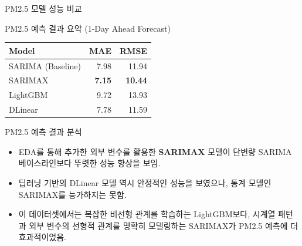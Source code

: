 \documentclass[serif, aspectratio=169]{beamer}
\begin{document}
\begin{frame}{PM2.5 모델 성능 비교}
    \begin{block}{\small PM2.5 예측 결과 요약 (1-Day Ahead Forecast)}
        \begin{center}
        \scriptsize
        \begin{tabular}{lrr}
        \toprule
        \textbf{Model} & \textbf{MAE} & \textbf{RMSE} \\
        \midrule
        SARIMA (Baseline) & 7.98 & 11.94 \\
        SARIMAX & \textbf{7.15} & \textbf{10.44} \\
        LightGBM & 9.72 & 13.93 \\
        DLinear & 7.78 & 11.59 \\
        \bottomrule
        \end{tabular}
        \end{center}
    \end{block}
    
    \begin{block}{\small PM2.5 예측 결과 분석}
        \begin{itemize}
            \item \scriptsize EDA를 통해 추가한 외부 변수를 활용한 \textbf{SARIMAX} 모델이 단변량 SARIMA 베이스라인보다 뚜렷한 성능 향상을 보임.
            \item \scriptsize 딥러닝 기반의 DLinear 모델 역시 안정적인 성능을 보였으나, 통계 모델인 SARIMAX를 능가하지는 못함.
            \item \scriptsize 이 데이터셋에서는 복잡한 비선형 관계를 학습하는 LightGBM보다, 시계열 패턴과 외부 변수의 선형적 관계를 명확히 모델링하는 SARIMAX가 PM2.5 예측에 더 효과적이었음.
          
        \end{itemize}
    \end{block}
\end{frame}

\end{document}
